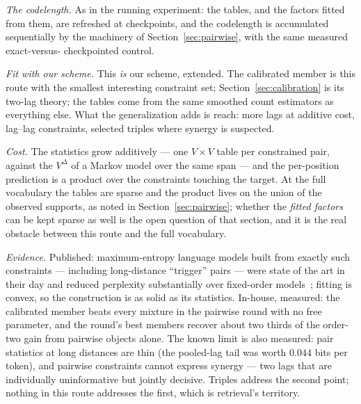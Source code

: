 \documentclass[11pt]{article}
\begin{document}
\emph{The codelength.}  As in the running experiment: the tables, and
the factors fitted from them, are refreshed at checkpoints, and the
codelength is accumulated sequentially by the machinery of
Section~\ref{sec:pairwise}, with the same measured exact-versus-%
checkpointed control.

\emph{Fit with our scheme.}  This \emph{is} our scheme, extended.
The calibrated member is this route with the smallest interesting
constraint set; Section~\ref{sec:calibration} is its two-lag theory;
the tables come from the same smoothed count estimators as everything
else.  What the generalization adds is reach: more lags at additive
cost, lag--lag constraints, selected triples where synergy is
suspected.

\emph{Cost.}  The statistics grow additively --- one $V \times V$
table per constrained pair, against the $V^{\Delta}$ of a Markov
model over the same span --- and the per-position prediction is a
product over the constraints touching the target.  At the full
vocabulary the tables are sparse and the product lives on the union
of the observed supports, as noted in Section~\ref{sec:pairwise};
whether the \emph{fitted factors} can be kept sparse as well is the
open question of that section, and it is the real obstacle between
this route and the full vocabulary.

\emph{Evidence.}  Published: maximum-entropy language models built
from exactly such constraints --- including long-distance
``trigger'' pairs --- were state of the art in their day and reduced
perplexity substantially over fixed-order models~\cite{rosenfeld};
fitting is convex, so the construction is as solid as its
statistics.  In-house, measured: the calibrated member beats every
mixture in the pairwise round with no free parameter, and the round's
best members recover about two thirds of the order-two gain from
pairwise objects alone.  The known limit is also measured: pair
statistics at long distances are thin (the pooled-lag tail was worth
$0.044$ bits per token), and pairwise constraints cannot express
synergy --- two lags that are individually uninformative but jointly
decisive.  Triples address the second point; nothing in this route
addresses the first, which is retrieval's territory.
\end{document}
